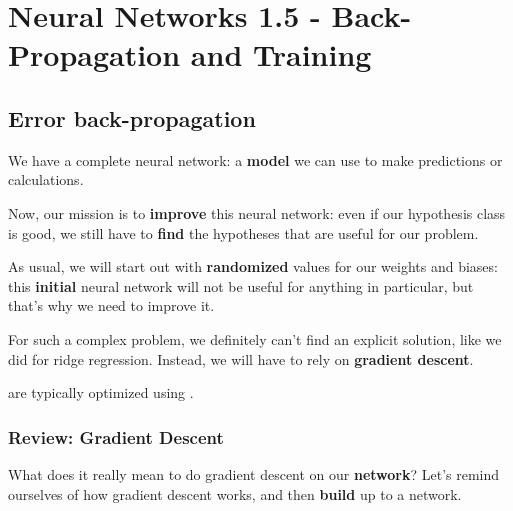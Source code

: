\setcounter{chapter}{6-1}

\chapter{Neural Networks 1.5 - Back-Propagation and Training}


\setcounter{section}{4}
\section{Error back-propagation }

    We have a complete neural network: a \textbf{model} we can use to make predictions or calculations.
    
    Now, our mission is to \textbf{improve} this neural network: even if our hypothesis class is good, we still have to \textbf{find} the hypotheses that are useful for our problem.
    
    As usual, we will start out with \textbf{randomized} values for our weights and biases: this \textbf{initial} neural network will not be useful for anything in particular, but that's why we need to improve it.
    
    For such a complex problem, we definitely can't find an explicit solution, like we did for ridge regression. Instead, we will have to rely on \textbf{gradient descent}.\\
    
    \begin{concept}
         are typically optimized using .
    \end{concept}
    
    \secdiv
    
    \subsection{Review: Gradient Descent}
    
        What does it really mean to do gradient descent on our \textbf{network}? Let's remind ourselves of how gradient descent works, and then \textbf{build} up to a network.
        
